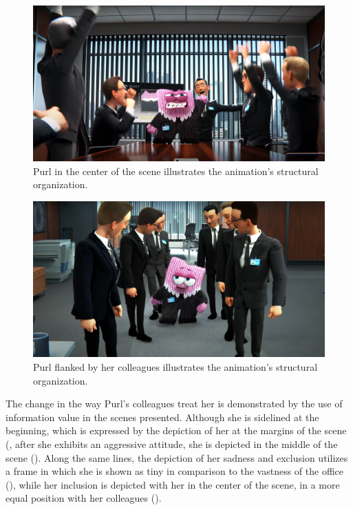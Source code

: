 \documentclass[english]{textolivre}
\begin{document}
\begin{figure}[htbp]
\centering
\begin{minipage}{.7\textwidth}
 \includegraphics[width=\textwidth]{Fig6.png}
 \caption{Purl in the center of the scene illustrates the animation’s structural organization.}
 \label{fig6}
\end{minipage}
\end{figure}


\begin{figure}[htbp]
\centering
\begin{minipage}{.7\textwidth}
 \includegraphics[width=\textwidth]{Fig7.png}
 \caption{Purl flanked by her colleagues illustrates the animation’s structural organization.}
 \label{fig7}
\end{minipage}
\end{figure}

The change in the way Purl’s colleagues treat her is demonstrated by the use of information value in the scenes presented. Although she is sidelined at the beginning, which is expressed by the depiction of her at the margins of the scene (, after she exhibits an aggressive attitude, she is depicted in the middle of the scene (). Along the same lines, the depiction of her sadness and exclusion utilizes a frame in which she is shown as tiny in comparison to the vastness of the office (), while her inclusion is depicted with her in the center of the scene, in a more equal position with her colleagues (). 
\end{document}
